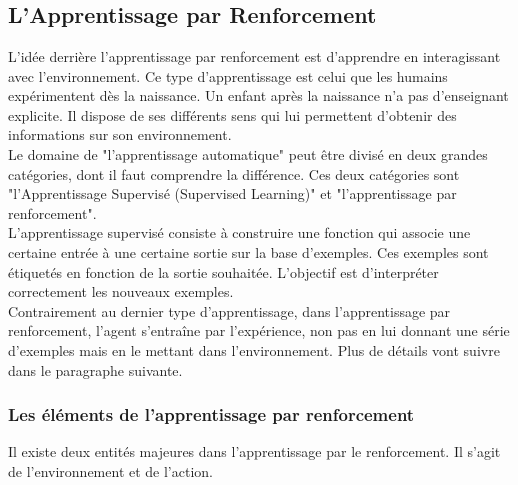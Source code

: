 \section{}
\subsection{L'Apprentissage par Renforcement}

L'idée derrière l'apprentissage par renforcement est d'apprendre en interagissant avec l'environnement. Ce type d'apprentissage est celui que les humains expérimentent dès la naissance. Un enfant après la naissance n'a pas d'enseignant explicite. Il dispose de ses différents sens qui lui permettent d'obtenir des informations sur son environnement. \\ 

Le domaine de "l'apprentissage automatique" peut être divisé en deux grandes catégories, dont il faut comprendre la différence. Ces deux catégories sont "l'Apprentissage Supervisé (Supervised Learning)" et "l'apprentissage par renforcement". \\ 

L'apprentissage supervisé consiste à construire une fonction qui associe une certaine entrée à une certaine sortie sur la base d'exemples.  Ces exemples sont étiquetés en fonction de la sortie souhaitée. L'objectif est d'interpréter correctement les nouveaux exemples. \\ 

Contrairement au dernier type d'apprentissage, dans l'apprentissage par renforcement, l'agent s'entraîne par l'expérience, non pas en lui donnant une série d'exemples mais en le mettant dans l'environnement. Plus de détails vont suivre dans le paragraphe suivante. 

\subsubsection{Les éléments de l'apprentissage par renforcement \cite{Lapan18}}

Il existe deux entités majeures dans l'apprentissage par le renforcement.  Il s'agit de l'environnement et de l'action. 













